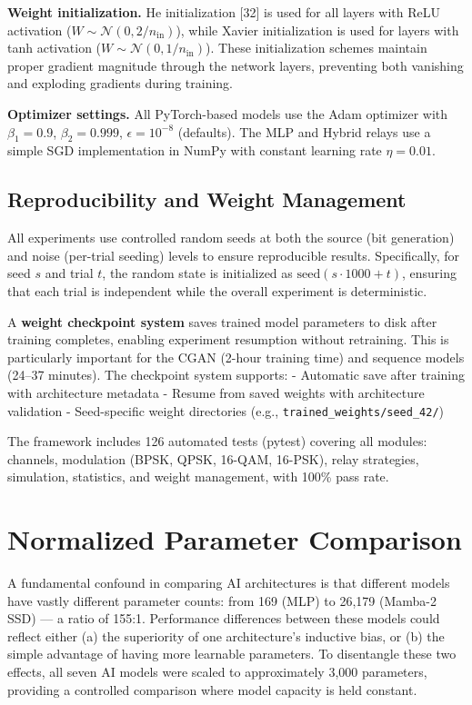 \documentclass[
  english,
  12pt,
  12pt,
  a4paper,
  oneside]{report}
\begin{document}
\textbf{Weight initialization.} He initialization {[}32{]} is used for all layers with ReLU activation (\(W \sim \mathcal{N}(0, 2/n_{\text{in}})\)), while Xavier initialization is used for layers with tanh activation (\(W \sim \mathcal{N}(0, 1/n_{\text{in}})\)). These initialization schemes maintain proper gradient magnitude through the network layers, preventing both vanishing and exploding gradients during training.

\textbf{Optimizer settings.} All PyTorch-based models use the Adam optimizer with \(\beta_1 = 0.9\), \(\beta_2 = 0.999\), \(\epsilon = 10^{-8}\) (defaults). The MLP and Hybrid relays use a simple SGD implementation in NumPy with constant learning rate \(\eta = 0.01\).

\subsection{Reproducibility and Weight Management}\label{sec:reproducibility-and-weight-management}

All experiments use controlled random seeds at both the source (bit generation) and noise (per-trial seeding) levels to ensure reproducible results. Specifically, for seed \(s\) and trial \(t\), the random state is initialized as \(\text{seed}(s \cdot 1000 + t)\), ensuring that each trial is independent while the overall experiment is deterministic.

A \textbf{weight checkpoint system} saves trained model parameters to disk after training completes, enabling experiment resumption without retraining. This is particularly important for the CGAN (2-hour training time) and sequence models (24--37 minutes). The checkpoint system supports: - Automatic save after training with architecture metadata - Resume from saved weights with architecture validation - Seed-specific weight directories (e.g., \texttt{trained\_weights/seed\_42/})

The framework includes 126 automated tests (pytest) covering all modules: channels, modulation (BPSK, QPSK, 16-QAM, 16-PSK), relay strategies, simulation, statistics, and weight management, with 100\% pass rate.

\section{Normalized Parameter Comparison}\label{sec:normalized-parameter-comparison}

A fundamental confound in comparing AI architectures is that different models have vastly different parameter counts: from 169 (MLP) to 26,179 (Mamba-2 SSD) --- a ratio of 155:1. Performance differences between these models could reflect either (a) the superiority of one architecture's inductive bias, or (b) the simple advantage of having more learnable parameters. To disentangle these two effects, all seven AI models were scaled to approximately 3,000 parameters, providing a controlled comparison where model capacity is held constant.
\end{document}
